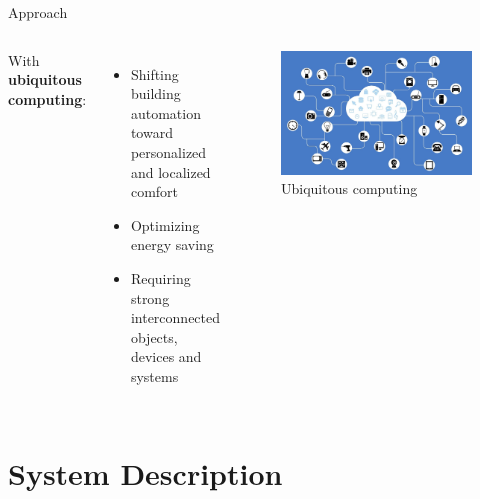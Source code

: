 \documentclass[aspectratio=169]{beamer}
\begin{document}
\begin{frame}{Approach}
    \begin{columns}
        With \textbf{ubiquitous computing}:
        \begin{itemize}[label=$\circ$]
            \item Shifting building automation toward personalized and localized comfort
            \item Optimizing energy saving
            \item Requiring strong interconnected objects, devices and systems
        \end{itemize}

        \begin{figure}
            \includegraphics[scale=0.2]{pic/ubiquitous-computing-intro.jpg}
            \caption{\small{Ubiquitous computing}} 
        \end{figure}
    \end{columns}
\end{frame}


\section{System Description}
\end{document}
